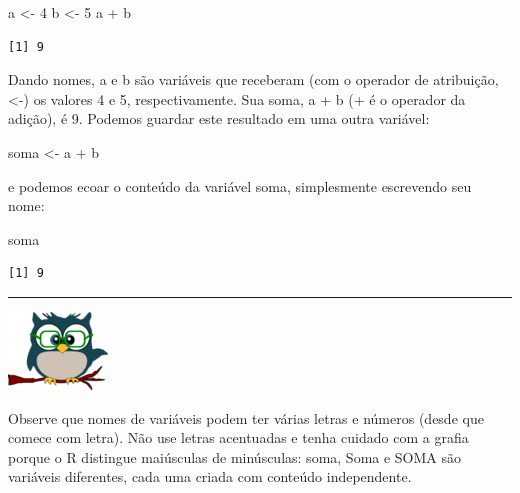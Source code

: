 \documentclass[
]{article}
\newenvironment{Shaded}{\begin{snugshade}}{\end{snugshade}}
\newcommand{\DecValTok}[1]{\textcolor[rgb]{0.00,0.00,0.81}{#1}}
\newcommand{\NormalTok}[1]{#1}
\newcommand{\OtherTok}[1]{\textcolor[rgb]{0.56,0.35,0.01}{#1}}
\newcommand{\SpecialCharTok}[1]{\textcolor[rgb]{0.00,0.00,0.00}{#1}}
\begin{document}
\begin{Shaded}
\begin{Highlighting}[]
\NormalTok{a }\OtherTok{\textless{}{-}} \DecValTok{4}
\NormalTok{b }\OtherTok{\textless{}{-}} \DecValTok{5}
\NormalTok{a }\SpecialCharTok{+}\NormalTok{ b}
\end{Highlighting}
\end{Shaded}

\begin{verbatim}
[1] 9
\end{verbatim}

Dando nomes, a e b são variáveis que receberam (com o operador de
atribuição, \textless-) os valores 4 e 5, respectivamente. Sua soma, a +
b (+ é o operador da adição), é 9. Podemos guardar este resultado em uma
outra variável:

\begin{Shaded}
\begin{Highlighting}[]
\NormalTok{soma }\OtherTok{\textless{}{-}}\NormalTok{ a }\SpecialCharTok{+}\NormalTok{ b}
\end{Highlighting}
\end{Shaded}

e podemos ecoar o conteúdo da variável soma, simplesmente escrevendo seu
nome:

\begin{Shaded}
\begin{Highlighting}[]
\NormalTok{soma}
\end{Highlighting}
\end{Shaded}

\begin{verbatim}
[1] 9
\end{verbatim}

\begin{center}\rule{0.5\linewidth}{0.5pt}\end{center}

\begin{flushleft}\includegraphics[width=0.08\linewidth]{coruja} \end{flushleft}

Observe que nomes de variáveis podem ter várias letras e números (desde
que comece com letra). Não use letras acentuadas e tenha cuidado com a
grafia porque o R distingue maiúsculas de minúsculas: soma, Soma e SOMA
são variáveis diferentes, cada uma criada com conteúdo independente.
\end{document}
